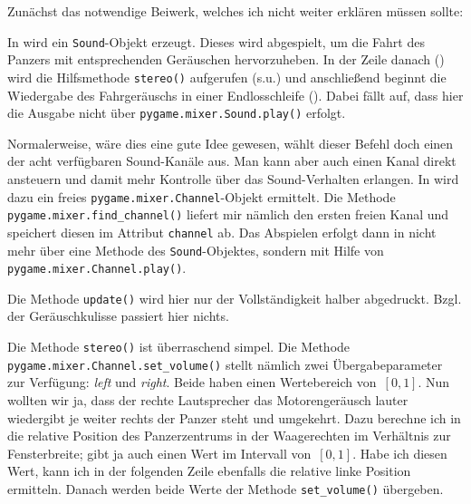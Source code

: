 
Zunächst das notwendige Beiwerk, welches ich nicht weiter erklären müssen sollte:


In  wird ein \texttt{Sound}-Objekt erzeugt. Dieses wird abgespielt, um die Fahrt des Panzers mit entsprechenden Geräuschen hervorzuheben. In der Zeile danach () wird die Hilfsmethode \texttt{stereo()} aufgerufen (s.u.) und anschließend beginnt die Wiedergabe des Fahrgeräuschs in einer Endlosschleife (). Dabei fällt auf, dass hier die Ausgabe nicht über \texttt{pygame.mixer.Sound.play()} erfolgt. 

Normalerweise, wäre dies eine gute Idee gewesen, wählt dieser Befehl doch einen der acht verfügbaren Sound-Kanäle aus. Man kann aber auch einen Kanal direkt ansteuern und damit mehr Kontrolle über das Sound-Verhalten erlangen. In  wird dazu ein freies  \texttt{pygame.mixer.Channel}-Objekt ermittelt. Die Methode \texttt{pygame.mixer.find\-\_chan\-nel()}  liefert mir nämlich den ersten freien Kanal und speichert diesen im Attribut \texttt{channel} ab. Das Abspielen erfolgt dann in  nicht mehr über eine Methode des \texttt{Sound}-Objektes, sondern mit Hilfe von \texttt{pygame.mixer.Channel.play()}. 


Die Methode \texttt{update()} wird hier nur der Vollständigkeit halber abgedruckt. Bzgl. der Geräuschkulisse passiert hier nichts. 


Die Methode \texttt{stereo()} ist überraschend simpel. Die Methode \texttt{pygame.mixer.Channel\-.set\-\_vol\-ume()} stellt nämlich zwei Übergabeparameter zur Verfügung: \emph{left} und \emph{right}. Beide haben einen Wertebereich von~$[0, 1]$. Nun wollten wir ja, dass der rechte Lautsprecher das Motorengeräusch lauter wiedergibt je weiter rechts der Panzer steht und umgekehrt. Dazu berechne ich in  die relative Position des Panzerzentrums in der Waagerechten im Verhältnis zur Fensterbreite; gibt ja auch einen Wert im Intervall von~$[0, 1]$. Habe ich diesen Wert, kann ich in der folgenden Zeile ebenfalls die relative linke Position ermitteln. Danach werden beide Werte der Methode \texttt{set\_volume()} übergeben. 


